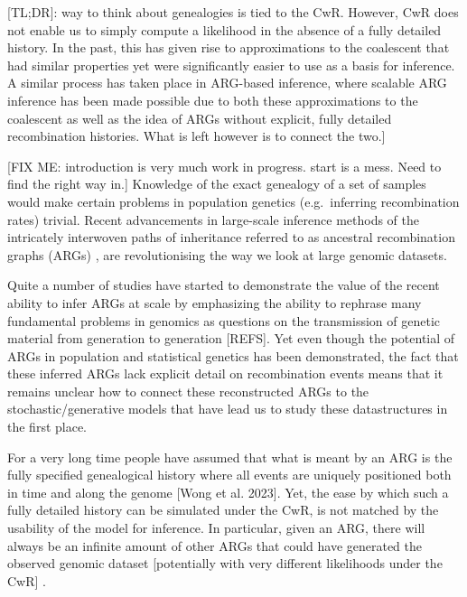 \documentclass{article}
\begin{document}
[TL;DR]: way to think about genealogies is tied to the CwR. However,
CwR does not enable us to simply compute a likelihood in the absence of a fully
detailed history. In the past, this has given rise to approximations to the
coalescent that had similar properties yet were significantly easier to use
as a basis for inference.
A similar process has taken place in ARG-based inference,
where scalable ARG inference has been made possible due to both these approximations
to the coalescent as well as the idea of ARGs without explicit, fully detailed
recombination histories. What is left however is to connect the two.]


[FIX ME: introduction is very much work in progress.
start is a mess. Need to find the right way in.]
Knowledge of the exact genealogy of a set of samples would make certain problems
in population genetics (e.g.\ inferring recombination rates) trivial.
Recent advancements in large-scale inference methods of the intricately
interwoven paths of inheritance referred to as ancestral recombination graphs (ARGs)
\citep{rasmussen_genome-wide_2014, heine_bridging_2018,
kelleher_inferring_2019, speidel_method_2019, rasmussen_espalier_2022, zhang_biobank-scale_2023},
are revolutionising the way we look at large genomic datasets.

Quite a number of studies have started to demonstrate the value of the recent ability to
infer ARGs at scale by emphasizing the ability to rephrase many fundamental problems
in genomics as questions on the transmission of genetic material from generation
to generation [REFS].
Yet even though the potential of ARGs in population and statistical genetics has
been demonstrated, the fact that these inferred ARGs lack explicit detail on
recombination events means that it remains unclear how to connect these
reconstructed ARGs to the stochastic/generative models that have lead us
to study these datastructures in the first place.

For a very long time people have assumed that what is meant by an ARG is the
fully specified genealogical history where all events are uniquely positioned
both in time and along the genome [Wong et al. 2023].
Yet, the ease by which such a fully detailed history can be simulated under the
CwR, is not matched by the usability of the model for inference.
In particular, given an ARG, there will always be an infinite amount of other
ARGs that could have generated the observed genomic dataset
[potentially with very different likelihoods under the CwR]
\citep{mcvean_approximating_2005}.
\end{document}
